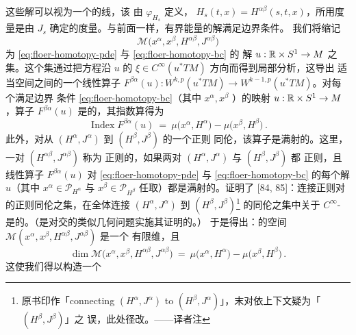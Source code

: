 这些解可以视为一个\trTimeDependent\trGradient\trFlow{}的\trFlow{}线，该%
\trFlow{}由\trActionFunctional{} $\varphi_{H_{s}}$ 定义，%
$H_{s}(t,x)=H^{\alpha\beta}(s,t,x)$，所用度量是由\trAlmostComplexStructure{}%
$J_{s}$ 确定的\trTimeDependent{}度量。与前面一样，有界能量的解满足边界条件。%
我们将缩记
\begin{equation}\label{eq:floer-M-alpha-beta}
\mathcal{M}\bigl(x^{\alpha},x^{\beta},H^{\alpha\beta},J^{\alpha\beta}\bigr)
\end{equation}
为 \eqref{eq:floer-homotopy-pde} 与 \eqref{eq:floer-homotopy-bc} 的\trSmooth{}%
解 $u:\mathbb{R}\times S^{1}\to M$ 之集。这个集通过把方程沿 $u$ 的\trVectorField{}%
$\xi\in C^{\infty}(u^{*}TM)$ 方向\trLinearization{}而得到局部分析，这导出%
适当\trSobolev{}空间之间的一个线性算子%
$F^{\beta\alpha}(u):W^{k,p}(u^{*}TM)\to W^{k-1,p}(u^{*}TM)$。对每个满足边界%
条件 \eqref{eq:floer-homotopy-bc}（其中 $x^{\alpha},x^{\beta}$%
\trNondegenerate）的\trSmooth{}映射 $u:\mathbb{R}\times S^{1}\to M$，算子%
$F^{\beta\alpha}(u)$ 是\trFredholm{}的，其指数算得为
\begin{equation}\label{eq:floer-index-fba}
\operatorname{Index}F^{\beta\alpha}(u)\ =\ \mu\bigl(x^{\alpha},H^{\alpha}\bigr)-\mu\bigl(x^{\beta},H^{\beta}\bigr)\,.
\end{equation}
此外，对从 $(H^{\alpha},J^{\alpha})$ 到 $(H^{\beta},J^{\beta})$ 的一个正则%
同伦，该算子是满射的。这里，一对 $(H^{\alpha\beta},J^{\alpha\beta})$ 称为%
正则的，如果两对 $(H^{\alpha},J^{\alpha})$ 与 $(H^{\beta},J^{\beta})$ 都%
正则，且线性算子 $F^{\beta\alpha}(u)$ 对 \eqref{eq:floer-homotopy-pde} 与%
\eqref{eq:floer-homotopy-bc} 的每个解 $u$（其中 $x^{\alpha}\in\mathcal{P}_{H^{\alpha}}$%
与 $x^{\beta}\in\mathcal{P}_{H^{\beta}}$ 任取）都是满射的。\trFloer{}证明了%
[84, 85]：连接正则对的正则同伦之集，在全体连接 $(H^{\alpha},J^{\alpha})$ 到%
$(H^{\beta},J^{\beta})$\footnote{原书印作「connecting $(H^{\alpha},J^{\alpha})$%
 to $(H^{\beta},J^{\alpha})$」，末对依上下文疑为「$(H^{\beta},J^{\beta})$」之%
误，此处径改。——译者注} 的\trSmooth{}同伦之集中关于 $C^{\infty}$-\trTopology{}%
是\trDense{}的。（\trFloer{}是对\trLagrange{}交的类似几何问题实施其证明的。）%
于是得出：\trConnectingOrbit{}的空间%
$\mathcal{M}(x^{\alpha},x^{\beta},H^{\alpha\beta},J^{\alpha\beta})$ 是一个%
有限维\trManifold{}，且
\begin{equation}\label{eq:floer-dim-mab}
\dim\mathcal{M}\bigl(x^{\alpha},x^{\beta},H^{\alpha\beta},J^{\alpha\beta}\bigr)\ =\ \mu\bigl(x^{\alpha},H^{\alpha}\bigr)-\mu\bigl(x^{\beta},H^{\beta}\bigr)\,.
\end{equation}
这使我们得以构造一个\trChainMap
